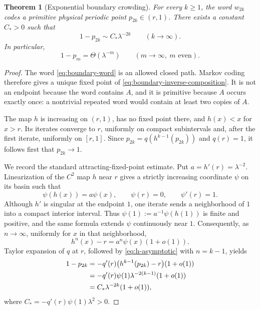 \documentclass[11pt]{article}
\newtheorem{theorem}{Theorem}[section]
\theoremstyle{definition}
\theoremstyle{remark}
\begin{document}
\begin{theorem}[Exponential boundary crowding]
\label{thm:boundary-crowding}
For every $k\ge1$, the word $w_{2k}$ codes a primitive physical periodic
point $p_{2k}\in(r,1)$.  There exists a constant $C_*>0$ such that
\begin{equation}\label{eq:boundary-asymptotic}
 1-p_{2k}\sim C_*\lambda^{-2k}
 \qquad(k\to\infty).
\end{equation}
In particular,
\begin{equation}\label{eq:boundary-theta}
 1-p_m=\Theta(\lambda^{-m})
 \qquad(m\to\infty,\ m\text{ even}).
\end{equation}
\end{theorem}

\begin{proof}
The word \eqref{eq:boundary-word} is an allowed closed path.  Markov coding
therefore gives a unique fixed point of \eqref{eq:boundary-inverse-composition}.
It is not an endpoint because the word contains $A$, and it is primitive
because $A$ occurs exactly once: a nontrivial repeated word would contain at
least two copies of $A$.

The map $h$ is increasing on $(r,1)$, has no fixed point there, and
$h(x)<x$ for $x>r$.  Its iterates converge to $r$, uniformly on compact
subintervals and, after the first iterate, uniformly on $[r,1]$.  Since
$p_{2k}=q(h^{k-1}(p_{2k}))$ and $q(r)=1$, it follows first that
$p_{2k}\to1$.

We record the standard attracting-fixed-point estimate.  Put
$a=h'(r)=\lambda^{-2}$.  Linearization of the $C^2$ map $h$ near $r$ gives a
strictly increasing coordinate $\psi$ on its basin such that
\begin{equation}\label{eq:koenigs}
 \psi(h(x))=a\psi(x),\qquad
 \psi(r)=0,\qquad \psi'(r)=1.
\end{equation}
Although $h'$ is singular at the endpoint $1$, one iterate sends a
neighborhood of $1$ into a compact interior interval.  Thus
$\psi(1):=a^{-1}\psi(h(1))$ is finite and positive, and the same formula
extends $\psi$ continuously near $1$.  Consequently, as $n\to\infty$,
uniformly for $x$ in that neighborhood,
\begin{equation}\label{eq:h-asymptotic}
 h^n(x)-r=a^n\psi(x)(1+o(1)).
\end{equation}
Taylor expansion of $q$ at $r$, followed by
\eqref{eq:h-asymptotic} with $n=k-1$, yields
\begin{align}
 1-p_{2k}
 &=-q'(r)\bigl(h^{k-1}(p_{2k})-r\bigr)(1+o(1))\notag\\
 &=-q'(r)\psi(1)\lambda^{-2(k-1)}(1+o(1))\notag\\
 &=C_*\lambda^{-2k}(1+o(1)),
 \label{eq:boundary-proof-asymptotic}
\end{align}
where $C_*=-q'(r)\psi(1)\lambda^2>0$.
\end{proof}
\end{document}
